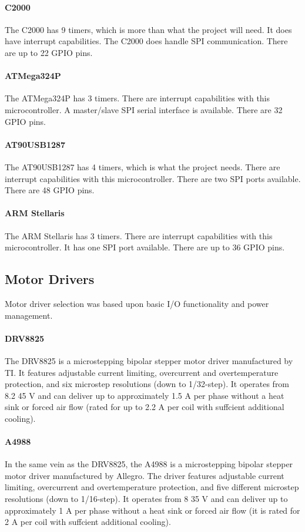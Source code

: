 \paragraph{C2000} The C2000 has 9 timers, which is more than what the project will need.
It does have interrupt capabilities.
The C2000 does handle SPI communication. 
There are up to 22 GPIO pins.

\paragraph{ATMega324P} The ATMega324P has 3 timers.
There are interrupt capabilities with this microcontroller.
A master/slave SPI serial interface is available.
There are 32 GPIO pins.   

\paragraph{AT90USB1287} The AT90USB1287 has 4 timers, which is what the project needs.
There are interrupt capabilities with this microcontroller.
There are two SPI ports available. 
There are 48 GPIO pins.

\paragraph{ARM Stellaris} The ARM Stellaris has 3 timers.
There are interrupt capabilities with this microcontroller.
It has one SPI port available.
There are up to 36 GPIO pins.

\subsection{Motor Drivers}
Motor driver selection was based upon basic I/O functionality and power management.

\paragraph{DRV8825}
The DRV8825 is a microstepping bipolar stepper motor driver manufactured by TI.
It features adjustable current limiting, overcurrent and overtemperature protection, and six microstep resolutions (down to 1/32-step).
It operates from 8.2 45 V and can deliver up to approximately 1.5 A per phase without a heat sink or forced air ﬂow (rated for up to 2.2 A per coil with suffcient additional cooling).

\paragraph{A4988}
In the same vein as the DRV8825, the A4988 is a microstepping bipolar stepper motor driver manufactured by Allegro.
The driver features adjustable current limiting, overcurrent and overtemperature protection, and five different microstep resolutions (down to 1/16-step).
It operates from 8 35 V and can deliver up to approximately 1 A per phase without a heat sink or forced air ﬂow (it is rated for 2 A per coil with suffcient additional cooling).

